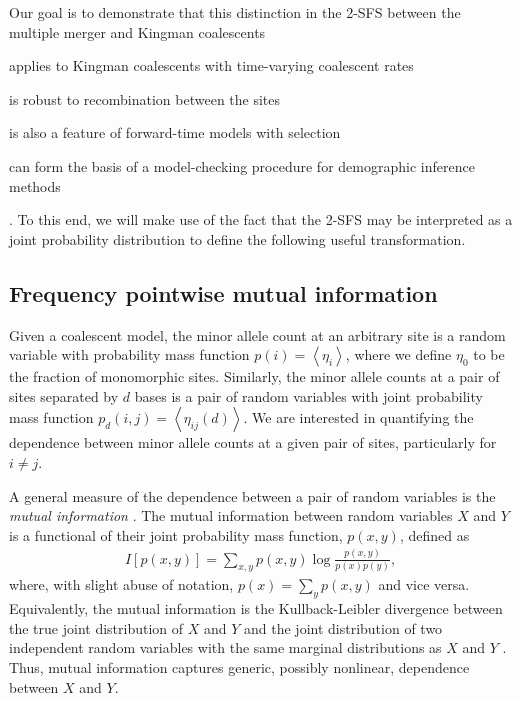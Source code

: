 \documentclass[11pt, letterpaper]{article}   	%
\newcommand{\E}[1]{\left< #1 \right>}
\begin{document}
Our goal is to demonstrate that this distinction in the 2-SFS between the multiple merger and Kingman coalescents
\begin{enumerate*}[label=(\roman*), before=\unskip{: }, itemjoin={{; }}, itemjoin*={{, and }}]
    \item applies to Kingman coalescents with time-varying coalescent rates
    \item is robust to recombination between the sites
    \item is also a feature of forward-time models with selection
    \item can form the basis of a model-checking procedure for demographic inference methods
\end{enumerate*}.
To this end, we will make use of the fact that the 2-SFS may be interpreted as a joint probability distribution to define the following useful transformation.

\subsection*{Frequency pointwise mutual information}

Given a coalescent model, the minor allele count at an arbitrary site is a random variable with probability mass function $p(i) = \E{\eta_i}$, where we define $\eta_0$ to be the fraction of monomorphic sites.
Similarly, the minor allele counts at a pair of sites separated by $d$ bases is a pair of random variables with joint probability mass function $p_d(i,j) = \E{\eta_{ij}(d)}$.
We are interested in quantifying the dependence between minor allele counts at a given pair of sites, particularly for $i\neq j$.

A general measure of the dependence between a pair of random variables is the \textit{mutual information} \autocite{CoverThomas1991}.
The mutual information between random variables $X$ and $Y$ is a functional of their joint probability mass function, $p(x,y)$, defined as
\begin{align}
    I[p(x,y)] = \sum_{x,y} p(x,y) \log \frac{p(x,y)}{p(x)p(y)},
    \label{eq:mutual_information}
\end{align}
where, with slight abuse of notation, $p(x) = \sum_y p(x,y)$ and vice versa.
Equivalently, the mutual information is the Kullback-Leibler divergence between the true joint distribution of $X$ and $Y$ and the joint distribution of two independent random variables with the same marginal distributions as $X$ and $Y$ \autocite{CoverThomas1991}.
Thus, mutual information captures generic, possibly nonlinear, dependence between $X$ and $Y$.
\end{document}
